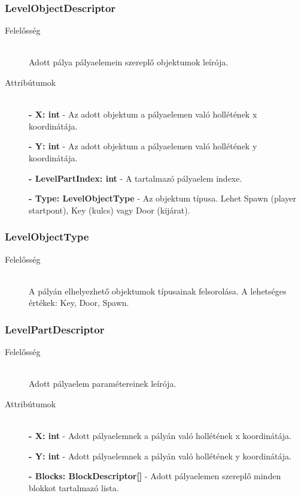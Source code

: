 \subsubsection{LevelObjectDescriptor}
	\begin{description}
		\item[Felelősség] \hfill \\
		Adott pálya pályaelemein szereplő objektumok leírója.
		
		\item[Attribútumok]\hfill \\
		\textbf{- X: int} - Az adott objektum a pályaelemen való hollétének x koordinátája.
		
		\textbf{- Y: int} - Az adott objektum a pályaelemen való hollétének y koordinátája.
		
		\textbf{- LevelPartIndex: int} - A tartalmazó pályaelem indexe.
		
		\textbf{- Type: LevelObjectType} - Az objektum típusa. Lehet Spawn (player startpont), Key (kulcs) vagy Door (kijárat).
						
	\end{description}
	
\subsubsection{LevelObjectType}
	\begin{description}
		\item[Felelősség] \hfill \\
		A pályán elhelyezhető objektumok típusainak felsorolása. A lehetséges értékek: Key, Door, Spawn.
		
	\end{description}
	
\subsubsection{LevelPartDescriptor}
	\begin{description}
		\item[Felelősség] \hfill \\
		Adott pályaelem paramétereinek leírója.

		\item[Attribútumok] \hfill \\
		\textbf{- X: int} - Adott pályaelemnek a pályán való hollétének x koordinátája.

		\textbf{- Y: int} - Adott pályaelemnek a pályán való hollétének y koordinátája.

		\textbf{- Blocks: BlockDescriptor[]} - Adott pályaelemen szereplő minden blokkot tartalmazó lista.

	\end{description}
	
